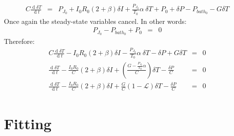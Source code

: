 \documentclass[letterpaper,10pt]{article}
\begin{document}
\begin{eqnarray}
	C \frac{\operatorname{d} \delta T}{\operatorname{d}t} &=& P_{J_0} + I_0 R_0 (2 + \beta) \delta I + \frac{P_{J_0}}{T_0}\alpha \: \delta T + P_0 + \delta P - P_{bath_0} - G\delta T 
\end{eqnarray}
Once again the steady-state variables cancel. In other words:
\begin{eqnarray}
	P_{J_0} - P_{bath_0} + P_0 &=& 0
\end{eqnarray}
Therefore:
\begin{eqnarray}
	C \frac{\operatorname{d} \delta T}{\operatorname{d}t} - I_0 R_0 (2 + \beta) \delta I - \frac{P_{J_0}}{T_0}\alpha \: \delta T - \delta P + G\delta T &=& 0 \\
	\frac{\operatorname{d} \delta T}{\operatorname{d}t} - \frac{I_0 R_0}{C} (2 + \beta) \delta I + \left(\frac{G - \frac{P_{J_0}}{T_0}\alpha}{C}\right) \delta T - \frac{\delta P}{C}  &=& 0 \\
	\frac{\operatorname{d} \delta T}{\operatorname{d}t} - \frac{I_0 R_0}{C} (2 + \beta) \delta I + \frac{G}{C}(1 - \mathcal{L}) \delta T - \frac{\delta P}{C}  &=& 0 \\
\end{eqnarray}

\section{Fitting}
\end{document}
